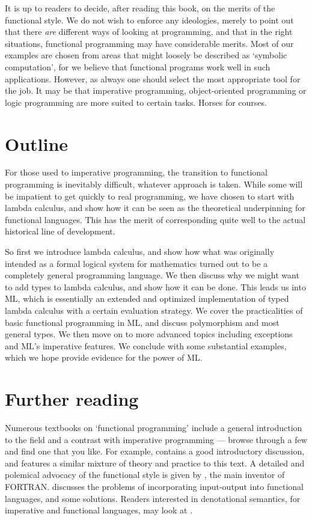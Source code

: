 It is up to readers to decide, after reading this book, on the merits of the
functional style. We do not wish to enforce any ideologies, merely to point out
that there {\em are} different ways of looking at programming, and that in the
right situations, functional programming may have considerable merits. Most of
our examples are chosen from areas that might loosely be described as `symbolic
computation', for we believe that functional programs work well in such
applications. However, as always one should select the most appropriate tool
for the job. It may be that imperative programming, object-oriented programming
or logic programming are more suited to certain tasks. Horses for courses.

\section{Outline}

For those used to imperative programming, the transition to functional
programming is inevitably difficult, whatever approach is taken. While some
will be impatient to get quickly to real programming, we have chosen to start
with lambda calculus, and show how it can be seen as the theoretical
underpinning for functional languages. This has the merit of corresponding
quite well to the actual historical line of development.

So first we introduce lambda calculus, and show how what was originally
intended as a formal logical system for mathematics turned out to be a
completely general programming language. We then discuss why we might want to
add types to lambda calculus, and show how it can be done. This leads us into
ML, which is essentially an extended and optimized implementation of typed
lambda calculus with a certain evaluation strategy. We cover the practicalities
of basic functional programming in ML, and discuss polymorphism and most
general types. We then move on to more advanced topics including exceptions and
ML's imperative features. We conclude with some substantial examples, which we
hope provide evidence for the power of ML.

\section*{Further reading}

Numerous textbooks on `functional programming' include a general introduction
to the field and a contrast with imperative programming --- browse through a
few and find one that you like. For example,  contains a
good introductory discussion, and features a similar mixture of theory and
practice to this text. A detailed and polemical advocacy of the functional
style is given by , the main inventor of FORTRAN.
 discusses the problems of incorporating input-output into
functional languages, and some solutions. Readers interested in denotational
semantics, for imperative and functional languages, may look at
.

